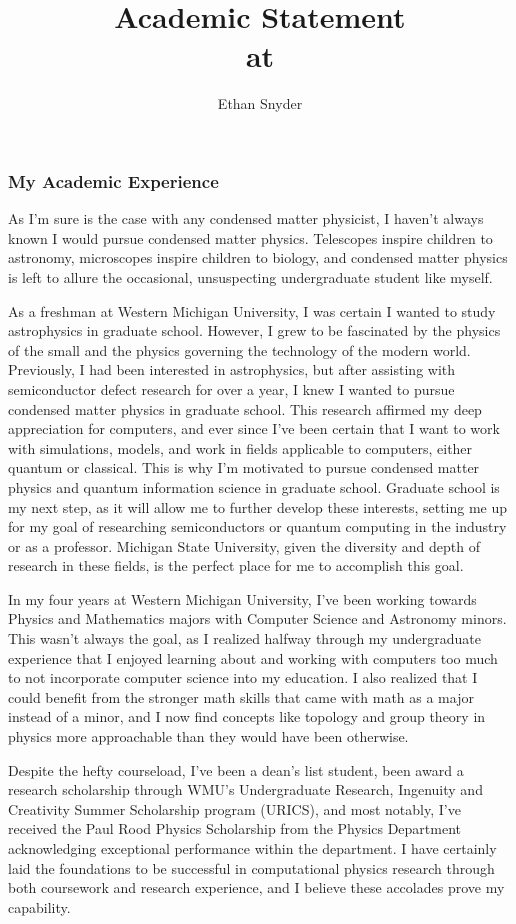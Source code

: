 \documentclass[11pt]{article}
\title{Academic Statement\\
	\large \dept{} at \school{}}
\author{Ethan Snyder}
\date{}
\newcommand{\school}{Michigan State University}
\begin{document}
\maketitle
\subsubsection*{My Academic Experience}
As I'm sure is the case with any condensed matter physicist, I haven't always known I would pursue condensed matter physics. Telescopes inspire children to astronomy, microscopes inspire children to biology, and condensed matter physics is left to allure the occasional, unsuspecting undergraduate student like myself.

As a freshman at Western Michigan University, I was certain I wanted to study astrophysics in graduate school. However, I grew to be fascinated by the physics of the small and the physics governing the technology of the modern world.  Previously, I had been interested in astrophysics, but after assisting with semiconductor defect research for over a year, I knew I wanted to pursue condensed matter physics in graduate school. This research affirmed my deep appreciation for computers, and ever since I've been certain that I want to work with simulations, models, and work in fields applicable to computers, either quantum or classical. This is why I'm motivated to pursue condensed matter physics and quantum information science in graduate school. Graduate school is my next step, as it will allow me to further develop these interests, setting me up for my goal of researching semiconductors or quantum computing in the industry or as a professor. \school{}, given the diversity and depth of research in these fields, is the perfect place for me to accomplish this goal.

In my four years at Western Michigan University, I've been working towards Physics and Mathematics majors with Computer Science and Astronomy minors. This wasn't always the goal, as I realized halfway through my undergraduate experience that I enjoyed learning about and working with computers too much to not incorporate computer science into my education. I also realized that I could benefit from the stronger math skills that came with math as a major instead of a minor, and I now find concepts like topology and group theory in physics more approachable than they would have been otherwise.

Despite the hefty courseload, I've been a dean's list student, been award a research scholarship through WMU's Undergraduate Research, Ingenuity and Creativity Summer Scholarship program (URICS), and most notably, I've received the Paul Rood Physics Scholarship from the Physics Department acknowledging exceptional performance within the department. I have certainly laid the foundations to be successful in computational physics research through both coursework and research experience, and I believe these accolades prove my capability.
\end{document}
